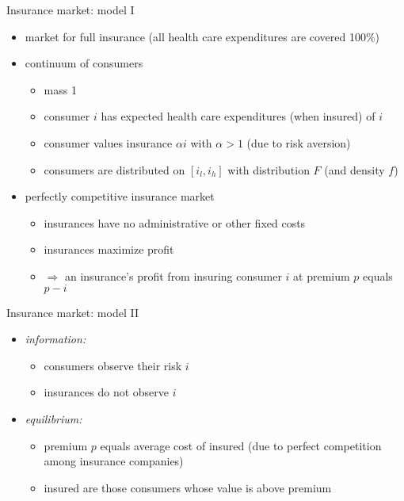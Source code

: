 \documentclass[bigger]{beamer}
\newcommand{\Ra}{\Rightarrow} \newcommand{\ra}{\rightarrow} \newcommand{\Lra}{\Leftrightarrow}
\begin{document}
\begin{frame}[label={sec:org1492799}]{Insurance market: model I}
\begin{itemize}
\item market for full insurance (all health care expenditures are covered 100\%)
\item continuum of consumers
\begin{itemize}
\item mass 1
\item consumer \(i\) has expected health care expenditures (when insured) of \(i\)
\item consumer values insurance \(\alpha i\) with \(\alpha>1\) (due to risk aversion)
\item consumers are distributed on \([i_l,i_h]\) with distribution \(F\) (and density \(f\))
\end{itemize}
\item perfectly competitive insurance market
\begin{itemize}
\item insurances have no administrative or other fixed costs
\item insurances maximize profit
\item \(\Ra\) an insurance's profit from insuring consumer \(i\) at premium \(p\) equals \(p-i\)
\end{itemize}
\end{itemize}
\end{frame}
\begin{frame}[label={sec:orgd395a66}]{Insurance market: model II}
\begin{itemize}
\item \emph{information:}
\begin{itemize}
\item consumers observe their risk \(i\)
\item insurances do not observe \(i\)
\end{itemize}
\item \emph{equilibrium:}
\begin{itemize}
\item premium \(p\) equals average cost of insured (due to perfect competition among insurance companies)
\item insured are those consumers whose value is above premium
\end{itemize}
\end{itemize}
\end{frame}
\end{document}

